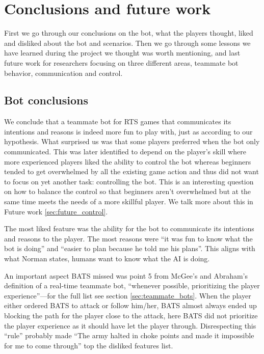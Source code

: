 \chapter{Conclusions and future work}
First we go through our conclusions on the bot, what the players thought, liked and disliked about the bot and scenarios. Then we go through some lessons we have learned during the project we thought was worth mentioning, and last future work for researchers focusing on three different areas, teammate bot behavior, communication and control.

\section{Bot conclusions}
We conclude that a teammate bot for RTS games that communicates its intentions and reasons is indeed more fun to play with, just as according to our hypothesis. What surprised us was that some players preferred when the bot only communicated.
This was later identified to depend on the player's skill where more experienced players liked the ability to control the bot whereas beginners tended to get overwhelmed by all the existing game action and thus did not want to focus on yet another task: controlling the bot.
This is an interesting question on how to balance the control so that beginners aren't overwhelmed but at the same time meets the needs of a more skillful player. We talk more about this in Future work \ref{sec:future_control}.

The most liked feature was the ability for the bot to communicate its intentions and reasons to the player. The most reasons were ``it was fun to know what the bot is doing'' and ``easier to plan because he told me his plans''. This aligns with what Norman states, humans want to know what the AI is doing\cite{norman07}.

An important aspect BATS missed was point 5 from McGee's and Abraham's definition\cite{mcgee10} of a real-time teammate bot, ``whenever possible, prioritizing the player experience''—for the full list see section \ref{sec:teammate_bots}. When the player either ordered BATS to attack or follow him/her, BATS almost always ended up blocking the path for the player close to the attack, here BATS did not prioritize the player experience as it should have let the player through. Disrespecting this ``rule'' probably made ``The army halted in choke points and made it impossible for me to come through'' top the disliked features list.

